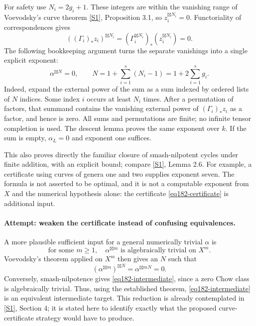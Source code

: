 \documentclass[11pt,a4paper]{article}
\newcommand{\sref}[2]{\hyperlink{source:#1:#2}{[S#2]}}
\numberwithin{equation}{section}
\begin{document}
For safety use $N_i=2g_i+1$. These integers are within the vanishing range
of Voevodsky's curve theorem \sref{182}{1}, Proposition 3.1, so
$z_i^{\boxtimes N_i}=0$. Functoriality of correspondences gives
\[
 ((\Gamma_i)_*z_i)^{\boxtimes N_i}
             =(\Gamma_i^{\boxtimes N_i})_*
                            (z_i^{\boxtimes N_i})=0.
\]
The following bookkeeping argument turns the separate vanishings into a
single explicit exponent:
\begin{equation}\label{eq182-exponent}
           \alpha^{\boxtimes N}=0,
             \qquad N=1+\sum_{i=1}^s(N_i-1)
                         =1+2\sum_{i=1}^s g_i.
\end{equation}
Indeed, expand the external power of the sum as a sum indexed by ordered
lists of $N$ indices. Some index $i$ occurs at least $N_i$ times. After a
permutation of factors, that summand contains the vanishing external power
of $(\Gamma_i)_*z_i$ as a factor, and hence is zero. All sums and
permutations are finite; no infinite tensor completion is used. The
descent lemma proves the same exponent over $k$. If the sum is empty,
$\alpha_L=0$ and exponent one suffices.

This also proves directly the familiar closure of smash-nilpotent cycles
under finite addition, with an explicit bound; compare
\sref{182}{1}, Lemma 2.6. For example, a certificate using curves of genera
one and two supplies exponent seven. The formula is not asserted to be
optimal, and it is not a computable exponent from $X$ and the numerical
hypothesis alone: the certificate \eqref{eq182-certificate} is additional
input.

\paragraph{Attempt: weaken the certificate instead of confusing equivalences.}
A more plausible sufficient input for a general numerically trivial
$\alpha$ is
\begin{equation}\label{eq182-intermediate}
 \text{for some }m\ge1,\quad
             \alpha^{\boxtimes m}\text{ is algebraically trivial on }X^m.
\end{equation}
Voevodsky's theorem applied on $X^m$ then gives an $N$ such that
\[
 (\alpha^{\boxtimes m})^{\boxtimes N}
                    =\alpha^{\boxtimes mN}=0.
\]
Conversely, smash-nilpotence gives \eqref{eq182-intermediate}, since a zero
Chow class is algebraically trivial. Thus, using the established theorem,
\eqref{eq182-intermediate} is an equivalent intermediate target. This
reduction is already contemplated in \sref{182}{1}, Section 4; it is
stated here to identify exactly what the proposed curve-certificate
strategy would have to produce.
\end{document}
